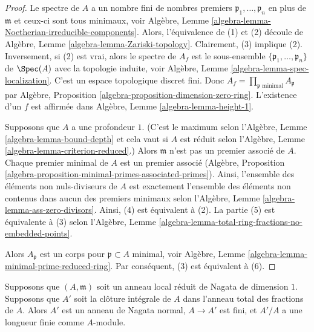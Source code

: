 \begin{proof}
Le spectre de $A$ a un nombre fini de nombres
premiers $\mathfrak p_1, \ldots, \mathfrak p_n$ en
plus de $\mathfrak m$ et ceux-ci sont tous minimaux,
voir Algèbre, Lemme
\ref{algebra-lemma-Noetherian-irreducible-components}.
Alors, l'équivalence de (1) et (2) découle de Algèbre,
Lemme \ref{algebra-lemma-Zariski-topology}. Clairement,
(3) implique (2). Inversement, si (2) est vrai, alors
le spectre de $A_f$ est le sous-ensemble $\{\mathfrak
p_1, \ldots, \mathfrak p_n\}$ de $\Spec(A)$ avec la
topologie induite, voir Algèbre, Lemme
\ref{algebra-lemma-spec-localization}. C'est un espace
topologique discret fini. Donc $A_f = \prod_{\mathfrak
p\text{ minimal}} A_\mathfrak p$ par Algèbre, Proposition
\ref{algebra-proposition-dimension-zero-ring}. L'existence d'un
$f$ est affirmée dans Algèbre, Lemme \ref{algebra-lemma-height-1}.

\medskip\noindent
Supposons que $A$ a une profondeur $1$. (C'est le maximum
selon l'Algèbre, Lemme \ref{algebra-lemma-bound-depth} et
cela vaut si $A$ est réduit selon l'Algèbre, Lemme
\ref{algebra-lemma-criterion-reduced}.) Alors $\mathfrak m$
n'est pas un premier associé de $A$. Chaque premier
minimal de $A$ est un premier associé (Algèbre, Proposition
\ref{algebra-proposition-minimal-primes-associated-primes}).
Ainsi, l'ensemble des éléments non nuls-diviseurs de $A$
est exactement l'ensemble des éléments non contenus dans
aucun des premiers minimaux selon l'Algèbre, Lemme
\ref{algebra-lemma-ass-zero-divisors}. Ainsi, (4) est équivalent
à (2). La partie (5) est équivalente à (3) selon l'Algèbre,
Lemme \ref{algebra-lemma-total-ring-fractions-no-embedded-points}.

\medskip\noindent
Alors $A_\mathfrak p$ est un corps pour
$\mathfrak p \subset A$ minimal, voir Algèbre,
Lemme
\ref{algebra-lemma-minimal-prime-reduced-ring}. Par conséquent, (3) est équivalent à (6).
\end{proof}

\begin{lemma}
\label{lemma-pre-delta-invariant}
Supposons que $(A, \mathfrak m)$ soit un anneau local réduit de Nagata de
dimension $1$. Supposons que $A'$ soit la clôture intégrale de $A$ dans
l'anneau total des fractions de $A$. Alors $A'$ est un anneau de Nagata
normal, $A \to A'$ est fini, et $A'/A$ a une longueur finie comme $A$-module.
\end{lemma}

